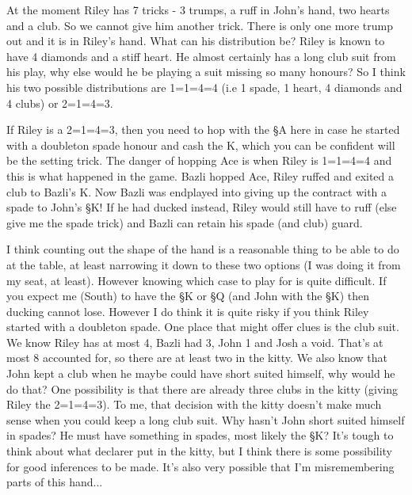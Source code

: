 \documentclass[a4paper]{JoshCards}
\begin{document}
At the moment Riley has 7 tricks - 3 trumps, a ruff in John's hand, two hearts and a club. So we cannot give him another trick. There is only one more trump out and it is in Riley's hand. What can his distribution be? Riley is known to have 4 diamonds and a stiff heart. He almost certainly has a long club suit from his play, why else would he be playing a suit missing so many honours? So I think his two possible distributions are 1=1=4=4 (i.e 1 spade, 1 heart, 4 diamonds and 4 clubs) or 2=1=4=3. 

If Riley is a 2=1=4=3, then you need to hop with the \S A here in case he started with a doubleton spade honour and cash the \C K, which you can be confident will be the setting trick. The danger of hopping Ace is when Riley is 1=1=4=4 and this is what happened in the game. Bazli hopped Ace, Riley ruffed and exited a club to Bazli's \C K. Now Bazli was endplayed into giving up the contract with a spade to John's \S K! If he had ducked instead, Riley would still have to ruff (else give me the spade trick) and Bazli can retain his spade (and club) guard. 

I think counting out the shape of the hand is a reasonable thing to be able to do at the table, at least narrowing it down to these two options (I was doing it from my seat, at least). However knowing which case to play for is quite difficult. If you expect me (South) to have the \S K or \S Q (and John with the \S K) then ducking cannot lose. However I do think it is quite risky if you think Riley started with a doubleton spade. One place that might offer clues is the club suit. We know Riley has at most 4, Bazli had 3, John 1 and Josh a void. That's at most 8 accounted for, so there are at least two in the kitty. We also know that John kept a club when he maybe could have short suited himself, why would he do that? One possibility is that there are already three clubs in the kitty (giving Riley the 2=1=4=3). To me, that decision with the kitty doesn't make much sense when you could keep a long club suit. Why hasn't John short suited himself in spades? He must have something in spades, most likely the \S K? It's tough to think about what declarer put in the kitty, but I think there is some possibility for good inferences to be made. It's also very possible that I'm misremembering parts of this hand...



\gamefont{\larger}
\leftupper{}%
{}{}
\rightlower{}{}{}
\showAll*
\end{document}
